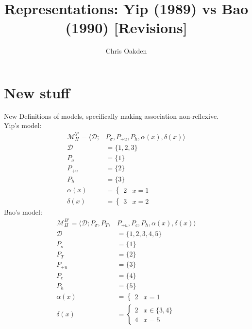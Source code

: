 \documentclass{article}
\title{Representations: Yip (1989) vs Bao (1990) [Revisions]}
\author{Chris Oakden}
\begin{document}
\maketitle
\section{New stuff}
New Definitions of models, specifically making association non-reflexive. \\
Yip's model:
\begin{equation}
\begin{split}
\mathcal{M}^{Y'}_{H} = \langle \mathcal{D}; &P_{\sigma}, P_{+u}, P_{h}, \alpha(x), \delta(x) \rangle \\
\mathcal{D} &= \{1, 2, 3\} \\
P_{\sigma} &= \{1\} \\
P_{+u} &= \{2\} \\
P_{h} &= \{3\} \\
\alpha(x) &= \begin{cases} 2 & x=1 \end{cases} \\
\delta(x) &= \begin{cases} 3 & x = 2 \end{cases} 
\end{split}
\end{equation}
Bao's model: \\
\begin{equation}
\begin{split}
\mathcal{M}^{B'}_{H} = \langle \mathcal{D}; P_{\sigma}, P_{T}, &P_{+u}, P_{c}, P_{h}, \alpha(x), \delta(x) \rangle \\
\mathcal{D} &= \{1, 2, 3, 4, 5\} \\
P_{\sigma} &= \{1\} \\
P_{T} &= \{2\} \\
P_{+u} &= \{3\} \\
P_{c} &= \{4\} \\
P_{h} &= \{5\} \\
\alpha(x) &= \begin{cases} 2 & x=1 \end{cases} \\
\delta(x) &= \begin{cases} 2 & x\in\{3,4\} \\
				     4 & x=5 \end{cases} \\
\end{split}
\end{equation}
\end{document}

